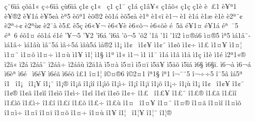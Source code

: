 {^^e7^^a86^^ef^^e5
^^e7^^f5^^e51^^ab
^^e7^^f76^^ef^^e5
^^e7^^f96^^ef^^e5
^^e71^^a2
^^e71^^ab^^a0
^^e71^^ad
^^e71^^af
^^e71^^e1
^^e71^^e2^^a5^^ab
^^e71^^e2^^f5^^ab
^^e71^^e7
^^e71^^e8
^^e8^^a0^^a31^^ad
^^e8^^a5^^aa1
^^e8^^a5^^ae2
^^e8^^a51^^e1
^^e8^^a55^^a2^^e0
^^e8^^aa5^^ad
^^e8^^f5^^aa1
^^e8^^f5^^ae2
^^e8^^f51^^e1
^^e8^^f55^^a2^^e0
^^e81^^aa
^^e81^^ab^^ef
^^e81^^ac
^^e81^^ad
^^e81^^e1
^^e81^^e6
^^e81^^e8
^^e82^^aa^^a8^^a2
^^e82^^aa^^f7^^a2
^^e82^^aa^^f9^^a2
^^e82^^af^^e0
^^e85^^a3
^^e85^^e7
^^e86^^ab^^a5^^ac
^^e86^^ab^^a5^^e8
^^e86^^ab^^f5^^ac
^^e86^^ab^^f5^^e8
^^e9^^a05^^e3
^^e9^^a51^^a4
^^e9^^a51^^e1
^^e9^^aa^^a0^^af5
^^e9^^aa^^a06
^^e9^^f51^^a4
^^e9^^f51^^e1
^^e91^^e9
'^^a5^^ac5^^ad
'^^a52
'^^ee6^^e1
'^^ee6^^e2
'^^f5^^ac5^^ad
'^^f52
'1^^e3
'1^^ee
'1^^ef2
^^ec^^a4^^ae^^e16
^^ec^^a4^^ae5
^^ec^^aa5^^ad
^^ec^^e11^^e2^^a8^^ad
^^ec^^e11^^e2^^f7^^ad
^^ec^^e11^^e2^^f9^^ad
^^ec^^e2^^a85^^e1
^^ec^^e2^^f75^^e1
^^ec^^e2^^f95^^e1
^^ec^^e5^^ae2
^^ec1^^a1
^^ec1^^a2^^a0
^^ec1^^a2^^a5
^^ec1^^a2^^a8
^^ec1^^a2^^f5
^^ec1^^a2^^f7
^^ec1^^a3
^^ec1^^a4^^a5
^^ec1^^a4^^a6
^^ec1^^a4^^a8
^^ec1^^a4^^f5
^^ec1^^a4^^f7
^^ec1^^a4^^f9
^^ec1^^a5
^^ec1^^a6
^^ec1^^a7
^^ec1^^aa
^^ec1^^ab
^^ec1^^ac
^^ec1^^ad
^^ec1^^af
^^ec1^^e1
^^ec1^^e2
^^ec1^^e5
^^ec1^^e7
^^ec1^^e8
^^ec1^^e9
^^ec2^^aa1^^ab^^ae
^^ec2^^ad^^e3^^ab
^^ec2^^e1^^ad
^^ec2^^e1^^e2^^a8
^^ec2^^e1^^e2^^f7
^^ec2^^e1^^e2^^f9
^^ec2^^e41^^e0
^^ec5^^a4^^e0
^^ec5^^a4^^ec
^^ec5^^a4^^ef
^^ec5^^e4^^a5
^^ec5^^e4^^f5
^^ec5^^ef^^e1
^^ec6^^a7^^ad
^^ec6^^a7^^ef.
^^ec6^^ac^^e0
^^ec6^^ac^^e1
^^ec6^^e8^^aa
^^ec6^^e9^^a0
^^ec6^^e9^^a5
^^ec6^^e9^^e3
^^ec6^^e9^^f5
^^ee^^a31^^ad
^^ee^^a41^^a6
^^ee^^a9^^a4^^ae6
^^ee^^a92^^a41
^^ee^^aa1^^a7
^^ee^^aa1^^ad
^^ee^^ac^^a8^^ad^^a85
^^ee^^ac^^f7^^ad^^f75
^^ee^^af5^^e2
^^ee^^e15^^aa
^^ee1^^a0
^^ee1^^a1^^a0
^^ee1^^a1^^a5
^^ee1^^a1^^a8
^^ee1^^a1^^ae
^^ee1^^a1^^e3
^^ee1^^a1^^ec^^ee
^^ee1^^a1^^ec^^f5
^^ee1^^a1^^ec^^f7
^^ee1^^a1^^ee
^^ee1^^a1^^ef
^^ee1^^a1^^f5
^^ee1^^a1^^f7
^^ee1^^a1^^f9
^^ee1^^a1
^^ee1^^a2^^a0
^^ee1^^a2^^a5
^^ee1^^a2^^a8
^^ee1^^a2^^ae
^^ee1^^a2^^e3
^^ee1^^a2^^ec^^ee
^^ee1^^a2^^ec^^f5
^^ee1^^a2^^ec^^f7
^^ee1^^a2^^ee
^^ee1^^a2^^ef
^^ee1^^a2^^f5
^^ee1^^a2^^f7
^^ee1^^a3^^a0
^^ee1^^a3^^a5
^^ee1^^a3^^a8
^^ee1^^a3^^ae
^^ee1^^a3^^e3
^^ee1^^a3^^ec^^ee
^^ee1^^a3^^ec^^f5
^^ee1^^a3^^ec^^f7
^^ee1^^a3^^ee
^^ee1^^a3^^ef
^^ee1^^a3^^f5
^^ee1^^a3^^f7
^^ee1^^a3^^f9
^^ee1^^a4^^a0
^^ee1^^a4^^a5
^^ee1^^a4^^a8
^^ee1^^a4^^ae
^^ee1^^a4^^e3
^^ee1^^a4^^ec^^ee
^^ee1^^a4^^ec^^f5
^^ee1^^a4^^ec^^f7
^^ee1^^a4^^ee
^^ee1^^a4^^ef
^^ee1^^a4^^f5
^^ee1^^a4^^f7
^^ee1^^a4^^f9
^^ee1^^a5
^^ee1^^a6^^a0
^^ee1^^a6^^a5
^^ee1^^a6^^a8
^^ee1^^a6^^ae
}
